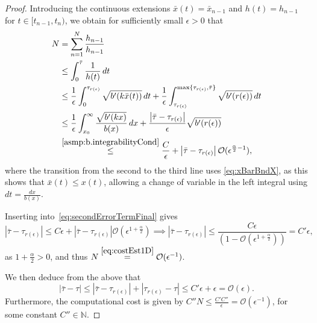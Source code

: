\documentclass[a4paper, oneside, reqno]{amsart}
\newcommand{\abs}[1]{\left\lvert#1\right\rvert}
\newcommand{\N}{\mathbb{N}}
\theoremstyle{remark}
\begin{document}
\begin{proof}
    Introducing the continuous extensions \(\bar x(t) = \bar x_{n-1}\) and \(h(t) = h_{n-1}\) for \(t \in [t_{n-1}, t_n)\), we obtain for sufficiently small \(\epsilon >0\) that
    \begingroup 
    \allowdisplaybreaks
    \begin{align}
    \label{eq:costEst1D}
        N &= \sum_{n=1}^{N}\frac{h_{n-1}}{h_{n-1}} \nonumber \\
        &\leq \int_0^{\bar\tau}\frac{1}{h(t)} \,dt \nonumber \\
          &\leq \frac{1}{\epsilon}\int_0^{\tau_{r(\epsilon)}} \sqrt{b'(k\bar x(t))} \,dt + \frac{1}{\epsilon}\int_{\tau_{r(\epsilon)}}^{\max\{\tau_{r(\epsilon)}, \bar\tau\}}\sqrt{b'(r(\epsilon))} \,dt \nonumber \\
          &\leq\frac{1}{\epsilon}\int_{x_0}^{\infty}\frac{\sqrt{b'(kx)}}{b(x)}\,dx + \frac{\abs{\bar\tau-\tau_{r(\epsilon)}}}{\epsilon}\sqrt{b'(r(\epsilon))} \nonumber \\
          &\stackrel{\ref{asmp:b.integrabilityCond}}{\le} \frac{C}{\epsilon} + \abs{\bar\tau-\tau_{r(\epsilon)}}\mathcal{O}(\epsilon^{\frac{\alpha}{2}-1}),
    \end{align}
    \endgroup
    where the transition from the second to the third line uses \eqref{eq:xBarBndX}, as this shows that \(\bar x(t) \leq x(t)\), allowing a change of variable in the left integral using \(dt = \frac{dx}{b(x)}\). 

    Inserting into~\eqref{eq:secondErrorTermFinal} gives
    \[\abs{\bar\tau-\tau_{r(\epsilon)}} \leq C\epsilon + \abs{\bar\tau-\tau_{r(\epsilon)}}\mathcal{O}(\epsilon^{1+\frac{\alpha}{2}}) \implies 
    \abs{\bar\tau-\tau_{r(\epsilon)}} 
    \leq \frac{C\epsilon}{(1-\mathcal{O}(\epsilon^{1+\frac{\alpha}{2}}))} 
    = C'\epsilon,\]
    as \(1+\frac{\alpha}{2}>0\), and thus
    \(N \stackrel{\eqref{eq:costEst1D}}{=} \mathcal{O}(\epsilon^{-1})\). 
    
    We then deduce from the above that 
    \[
    \abs{\bar\tau-\tau} \leq \abs{\bar\tau-\tau_{r(\epsilon)}} + \abs{\tau_{r(\epsilon)}-\tau} \leq C'\epsilon + \epsilon = \mathcal{O}(\epsilon).
    \]
    Furthermore, the computational cost is given by \(C''N \leq \frac{C'C''}{\epsilon} = \mathcal{O}(\epsilon^{-1})\), for some constant \(C''\in\N\).
\end{proof}
\end{document}
